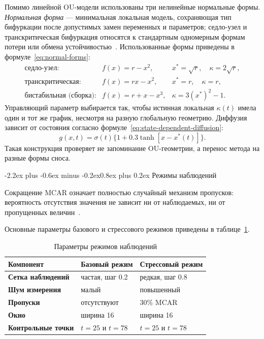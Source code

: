 \documentclass[12pt,a4paper]{article}
\makeatletter
\numberwithin{table}{section}
\numberwithin{figure}{section}
\renewcommand\subsection{\@startsection{subsection}{2}{0pt}
  {-2.2ex plus -0.6ex minus -0.2ex}{0.8ex plus 0.2ex}
  {\normalfont\normalsize\bfseries}}
\newcommand{\term}[1]{\textit{#1}}
\makeatother
\begin{document}
Помимо линейной OU-модели использованы три нелинейные нормальные формы.
\term{Нормальная форма} --- минимальная локальная модель, сохраняющая тип
бифуркации после допустимых замен переменных и параметров; седло-узел и
транскритическая бифуркация относятся к стандартным одномерным формам
потери или обмена устойчивостью~\cite{strogatz2015}. Использованные формы
приведены в формуле~\eqref{eq:normal-forms}:
\begin{equation}
\tag{2.1}
\label{eq:normal-forms}
\begin{array}{lll}
\text{седло-узел:} & f(x)=r-x^2, & x^*=\sqrt r,\quad\kappa=2\sqrt r,\\
\text{транскритическая:} & f(x)=rx-x^2, & x^*=r,\quad\kappa=r,\\
\text{бистабильная (сборка):} & f(x)=r+x-x^3, & \kappa=3(x^*)^2-1.
\end{array}
\end{equation}
Управляющий параметр выбирается так, чтобы истинная локальная $\kappa(t)$
имела один и тот же график, несмотря на разную глобальную геометрию. Диффузия
зависит от состояния согласно формуле~\eqref{eq:state-dependent-diffusion}:
\begin{equation}
\tag{2.2}
\label{eq:state-dependent-diffusion}
 g(x,t)=\sigma(t)\{1+0.3\tanh[x-x^*(t)]\}.
\end{equation}
Такая конструкция проверяет не запоминание OU-геометрии, а перенос метода на
разные формы сноса.

\subsection{Режимы наблюдений}

Сокращение MCAR означает полностью случайный механизм пропусков: вероятность
отсутствия значения не зависит ни от наблюдаемых, ни от пропущенных
величин~\cite{rubin1976}.

Основные параметры базового и стрессового режимов приведены в
таблице~\ref{tab:observation-regimes}.

\begin{table}[H]
\caption{Параметры режимов наблюдений}
\label{tab:observation-regimes}
\centering\small
\begin{tabularx}{\textwidth}{>{\bfseries}p{39mm}XX}
\toprule
Компонент & Базовый режим & Стрессовый режим \\
\midrule
Сетка наблюдений & частая, шаг 0.2 & редкая, шаг 0.8 \\
Шум измерения & малый & повышенный \\
Пропуски & отсутствуют & 30\% MCAR \\
Окно & ширина 16 & ширина 16 \\
Контрольные точки & $t=25$ и $t=78$ & $t=25$ и $t=78$ \\
\bottomrule
\end{tabularx}
\end{table}
\end{document}
